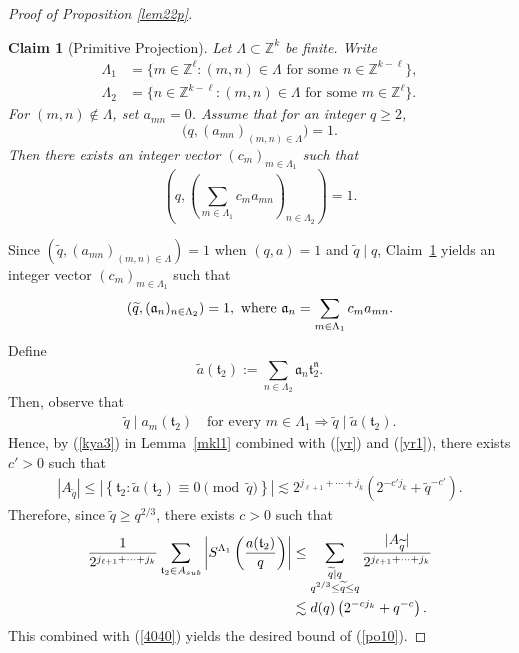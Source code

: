 \documentclass[10pt,a4paper]{amsart}
\newtheorem{claim}{Claim}\numberwithin{claim}{section}
\numberwithin{equation}{section}
\begin{document}
\begin{proof}[Proof of Proposition \ref{lem22p}]
	\begin{claim}[Primitive Projection]\label{hc1}
		Let $\Lambda\subset \mathbb Z^k$ be finite. Write
		\begin{align*}
			\Lambda_1
			&=
			\bigl\{
			m\in\mathbb{Z}^{\ell}
			:
			(m,n)\in\Lambda
			\text{ for some } n\in\mathbb{Z}^{k-\ell}
			\bigr\},\\
			\Lambda_2
			&=
			\bigl\{
			n\in\mathbb{Z}^{k-\ell}
			:
			(m,n)\in\Lambda
			\text{ for some } m\in\mathbb{Z}^{\ell}
			\bigr\}.
		\end{align*}
		For $(m,n)\notin\Lambda$, set $a_{mn}=0$. Assume that for an integer $q\ge 2$, 
		\[
		\bigl(q,(a_{mn})_{(m,n)\in\Lambda}\bigr)=1.
		\]
		Then there exists an  integer vector $(c_m)_{m\in \Lambda_1}$ such that
		\[
		\!\left(
		q,
		\left(\sum_{m\in \Lambda_1} c_m a_{mn}\right)_{n\in\Lambda_2}
		\right)=1.
		\]
	\end{claim}
	Since $(\widetilde q,(a_{mn})_{(m,n)\in \Lambda})=1$ when $(q,a)=1$ and $\widetilde q\mid q$,
	Claim~\ref{hc1} yields an integer vector
	$(c_m)_{m\in\Lambda_1}$ such that
\begin{align}\label{yr}
		(\widetilde q,
	(\mathfrak a_{n})_{n\in\Lambda_2})
	=1,\ \text{where
		$
		\mathfrak a_{n}
		=
		\sum_{m\in\Lambda_1}
		c_m a_{mn}.
		$}
\end{align}
	Define
	\[
	\widetilde a(\mathfrak t_2)
	:=
	\sum_{n\in\Lambda_2}
	\mathfrak a_{n}
	\mathfrak t_2^{\mathfrak n}.
	\]
	Then, observe that 
	\begin{align}\label{yr1}
	\widetilde q
	\mid
	a_m(\mathfrak t_2)
	\quad
	\text{for every }
	m\in\Lambda_1 \Rightarrow \widetilde q
	\mid
	\widetilde a(\mathfrak t_2).	
	\end{align}
	Hence, by (\ref{kya3}) in Lemma~\ref{mkl1} combined with (\ref{yr}) and (\ref{yr1}), there exists $c'>0$ such that
	\begin{align*}
		|A_{\widetilde q}|
		\le
		\left|
		\left\{
		\mathfrak t_2
		:
		\widetilde a(\mathfrak t_2)
		\equiv0
		\pmod{\widetilde q}
		\right\}
		\right|  
		\lesssim 
		2^{j_{\ell+1}+\cdots+j_k}
		(2^{-c'j_k}
		+\widetilde q^{-c'}).
	\end{align*}
Therefore,	since $\widetilde q\ge q^{2/3}$, there exists $c>0$ such that
	\begin{align*}
		\frac1{2^{j_{\ell+1}+\cdots+j_k}}
		\sum_{\mathfrak t_2\in A_{\rm sub}}
		\left|
		S^{\Lambda_1}
		\left(
		\frac{a(\mathfrak t_2)}{q}
		\right)
		\right|   
		&\le
		\sum_{\substack{\widetilde q\mid q\\
				q^{2/3}\le\widetilde q\le q}}
		\frac{|A_{\widetilde q}|}
		{2^{j_{\ell+1}+\cdots+j_k}}    \\
		&\lesssim d(q)
		\left(
		2^{-cj_k}
		+
		q^{-c}
		\right).
	\end{align*}
	This combined with (\ref{4040}) yields the desired bound of (\ref{po10}). 
\end{proof}
\end{document}
